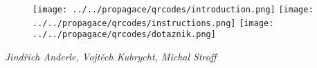 \documentclass{../../style/mkimain}
\begin{document}
\begin{figure}[H]
      \texttt{[image: ../../propagace/qrcodes/introduction.png]}
    \endminipage\hfill
      \texttt{[image: ../../propagace/qrcodes/instructions.png]}
    \endminipage\hfill
      \texttt{[image: ../../propagace/qrcodes/dotaznik.png]}
    \endminipage
  \end{figure}
\vspace{1,5cm}
\begin{center}
  \textit{Jindřich Anderle, Vojtěch Kubrycht, Michal Stroff\\}
  \vspace{0.5cm}
  \color{blue}{kvantuminformaci@gmail.com}
\end{center}
\vspace*{\fill}
\end{document}

